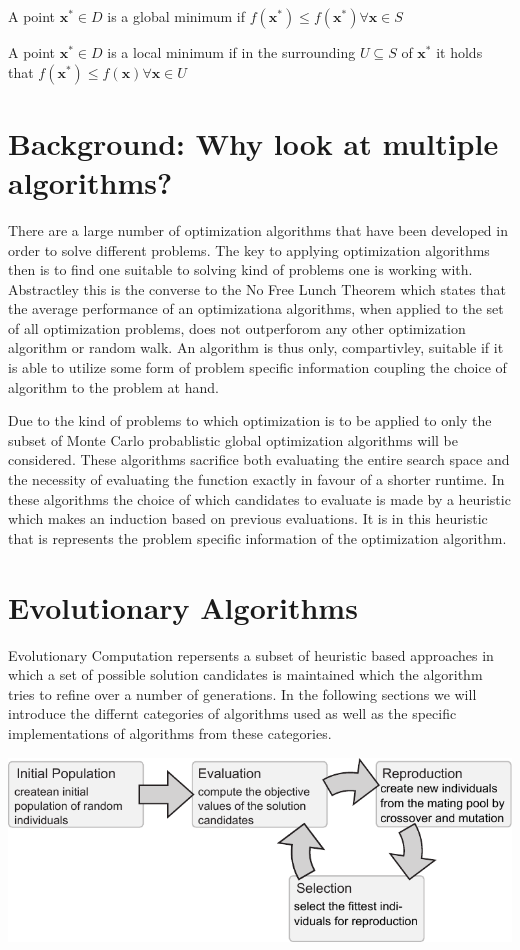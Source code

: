 \documentclass[a4paper,titlepage]{report}
\begin{document}
\noindent
A point $\mathbf{x}^* \in D$ is a global minimum if  $ f(\mathbf{x}^*) \leq f(\mathbf{x}^*)  \forall  \mathbf{x} \in S$

\noindent
A point $\mathbf{x}^* \in D$ is a local minimum if  in the surrounding  $ U \subseteq S$ of  $\mathbf{x}^*$ it holds that $f(\mathbf{x}^*)  \leq f(\mathbf{x})  \forall  \mathbf{x} \in U$


\section{Background: Why look at multiple algorithms?}
There are a large number of optimization algorithms that have been developed in order to solve different problems. The key to applying optimization algorithms then is to find one suitable to solving kind of problems one is working with. Abstractley this is the converse to the No Free Lunch Theorem which states that the average performance of an optimizationa algorithms, when applied to the set of all optimization problems,  does not outperforom any other optimization algorithm or random walk. An algorithm is thus only, compartivley, suitable if it is able to utilize some form of problem specific information coupling the choice of algorithm to the problem at hand.

Due to the kind of problems to which optimization is to be applied to only the subset of Monte Carlo probablistic global optimization algorithms will be considered. These algorithms sacrifice both evaluating the entire search space and the necessity of evaluating the function exactly in favour of a shorter runtime. In these algorithms the choice of which candidates to evaluate is made by a heuristic which makes an induction based on previous evaluations. It is in this heuristic that is represents the problem specific information of the optimization algorithm.


\section{Evolutionary Algorithms}

Evolutionary Computation repersents a subset of heuristic based approaches in which a set of possible solution candidates is maintained which the algorithm tries to refine over a number of generations. In the following sections we will introduce the differnt categories of algorithms used as well as the specific implementations of algorithms from these categories.

\includegraphics{Images/evolution_v2.pdf}
\end{document}
